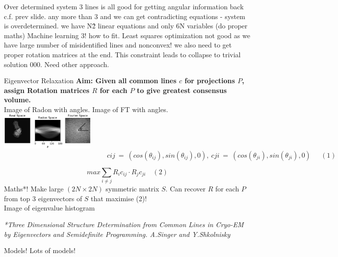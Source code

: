 \documentclass[t, 11pt]{beamer}
\begin{document}
\begin{frame}[fragile]{Over determined system}
  3 lines is all good for getting angular information back c.f. prev slide.
  any more than 3 and we can get contradicting equations - system is overdetermined. we have N\^2 linear equations and only 6N variables (do proper maths)
  Machine learning 3! how to fit. Least squares optimization not good as we have large number of misidentified lines and nonconvex! we also need to get proper rotation matrices at the end. This constraint leads to collapse to trivial solution 000. Need other approach.
\end{frame}

\begin{frame}[fragile]{Eigenvector Relaxation}
  \small
  \textbf{Aim: Given all common lines $c$ for projections $P$, assign Rotation matrices $R$ for each $P$ to give greatest consensus volume.} \\
  Image of Radon with angles. Image of FT with angles.\\
  \includegraphics[width=0.35\textwidth]{images/radon_ft.png}
\vspace{-3.7em}
  \hspace{3em}\tiny{$$\hspace{15em}cij~=~(cos(\theta_{ij}),sin(\theta_{ij}),0),~cji~=~(cos(\theta_{ji}),sin(\theta_{ji}),0)~\quad~(1)$$}

  \small
  $$max\sum_{i\ne j} R_ic_{ij} \cdot R_jc_{ji} \quad (2)$$
  Maths*! Make large $(2N \times 2N)$ symmetric matrix $S$. Can recover $R$ for each $P$ from top 3 eigenvectors of $S$ that maximise (2)! \\
  Image of eigenvalue histogram
  

  \textit{\tiny{*Three Dimensional Structure Determination from Common Lines in Cryo-EM by Eigenvectors and Semidefinite Programming. A.Singer and Y.Shkolnisky}}
\end{frame}

\begin{frame}[fragile]{Models!}
  Lots of models!
\end{frame}
\end{document}
